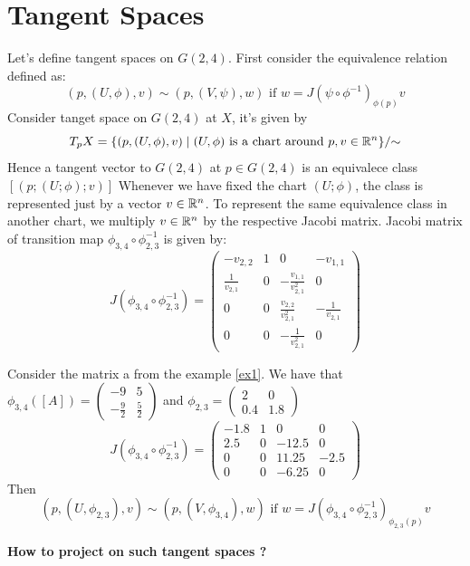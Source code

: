 \documentclass[11pt,a4paper]{report}
\begin{document}
\chapter{Tangent Spaces}
Let's define tangent spaces on $G(2,4)$. 
First consider the equivalence relation defined as:
$$ (p, (U,\phi), v) \sim (p, (V, \psi), w) \text{ if } w = J( \psi \circ \phi^{-1})_{\phi(p)} v $$
Consider tanget space on $G(2,4)$ at $X$, it's given by 
$$ T_p X = \{ (p,(U,\phi),v) \;|\; (U,\phi) \text{ is a chart around } p, v \in \mathbb{R}^n \}/{\sim} $$
Hence a tangent vector to $G(2,4)$ at $p \in G(2,4)$ is an equivalece class $ [ (p; (U; \phi); v)] $  
Whenever we have fixed the chart $(U; \phi)$, the class is represented just by a vector $v \in \mathbb{R}^n$.
To represent the same equivalence class in another chart, we multiply $v \in \mathbb{R}^n$ by the respective Jacobi matrix.
\newline
Jacobi matrix of transition map $\phi_{3,4} \circ \phi_{2,3}^{-1}$ is given by:
$$ J(\phi_{3,4} \circ \phi_{2,3}^{-1}) = 
\begin{pmatrix} 
    -v_{2,2} & 1 & 0 & -v_{1,1} \\
    \frac{1}{v_{2,1}} & 0 & -\frac{v_{1,1}}{v_{2,1}^2} & 0 \\
    0 & 0 & \frac{v_{2,2}}{v_{2,1}^2} & -\frac{1}{v_{2,1}} \\
    0 & 0 & -\frac{1}{v_{2,1}^2} & 0 
\end{pmatrix} $$
\begin{Ex}\label{tangentSpaces}
Consider the matrix a from the example \ref{ex1}. 
We have that $\phi_{3,4}([A]) = \begin{pmatrix} -9 & 5 \\ -\frac{9}{2} & \frac{5}{2} \end{pmatrix}$ and   
$\phi_{2,3} = \begin{pmatrix} 2 & 0 \\ 0.4 & 1.8 \end{pmatrix}$
$$ J(\phi_{3,4} \circ \phi_{2,3}^{-1}) =
\begin{pmatrix} 
    -1.8 & 1 & 0 & 0 \\
    2.5 & 0 & -12.5 & 0 \\
    0 & 0 & 11.25 & -2.5 \\
    0 & 0 & -6.25 & 0
\end{pmatrix} $$
Then 
$$ (p, (U,\phi_{2,3}), v) \sim (p, (V, \phi_{3,4}), w) \text{ if } w = J( \phi_{3,4} \circ \phi_{2,3}^{-1})_{\phi_{2,3}(p)} v $$
\end{Ex}
\textbf{How to project on such tangent spaces ?}
\newline
\end{document}
